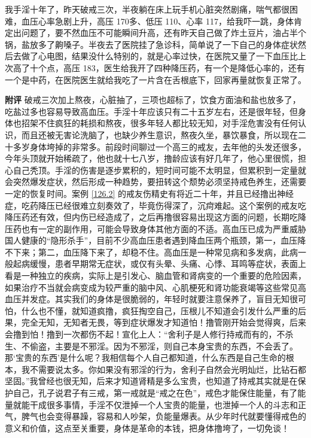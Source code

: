 \begin{case}
    我手淫十年了，昨天破戒三次，半夜躺在床上玩手机心脏突然剧痛，喘气都很困难，血压心率急剧上升，高压 170多、低压 110、心率 117，给我吓一跳，身体肯定出问题了，要不然血压不可能瞬间升高，还有昨天自己做了炸土豆片，油占半个锅，盐放多了齁嗓子。半夜去了医院挂了急诊科，简单说了一下自己的身体症状然后去做了心电图，结果没什么特别的，就是心率过快，在医院又量了一下血压比上次高了十个点，高压 183，医生给我开了四种降压药，有一个是降低心率的，还有一个是中药，在医院医生就给我吃了一片含在舌根底下，回家再量就恢复正常了。

    \textbf{附评} 破戒三次加上熬夜，心脏抽了，三项也超标了，饮食方面油和盐也放多了，吃盐过多也容易导致高血压。手淫十年应该只有二十五岁左右，还是很年轻，但身体也招架不住疯狂的耗损和熬夜，很多年轻人都比较无知，对手淫危害没有任何认识，而且还被无害论洗脑了，也缺少养生意识，熬夜久坐，暴饮暴食，所以现在二十多岁身体垮掉的非常多。前段时间聊过一个高三的戒友，去年他的头发还很多，今年头顶就开始稀疏了，他也就十七八岁，撸龄应该有好几年了，他心里很慌，担心自己秃顶。手淫的伤害是逐步累积的，短时间可能不太明显，但累积到一定量就会突然爆发症状，然后形成一种趋势，要扭转这个颓势必须坚持戒色养生，还需要一定的恢复时间。案例 \ref{126.2} 的戒友伤精史有将近二十年，并且已经撸出神经症，吃药降压已经很难立刻奏效了，毕竟伤得深了，沉疴难起。这个案例的戒友吃降压药还有效，但内伤已经造成了，之后再撸很容易出现这方面的问题，长期吃降压药也有一定的副作用，可能会导致身体其他方面的不适。高血压已成为严重威胁国人健康的“隐形杀手”，目前不少高血压患者遇到降血压两个瓶颈，第一，血压降不下来；第二，血压降下来了，却稳不住。高血压是一种常见病和多发病，此病一般起病缓慢，患者早期常无症状，或仅有头晕、头痛、心悸、耳鸣等症状，表面上看是一种独立的疾病，实际上是引发心、脑血管和肾病变的一个重要的危险因素，如果治疗不当就会病变成为较严重的脑中风、心肌梗死和肾功能衰竭等这些常见高血压并发症。其实我们的身体是很脆弱的，年轻时就要注意保养了，盲目无知很可怕，什么也不懂，就知道疯撸，疯狂掏空自己，压根儿不知道会引发什么严重的后果，完全无知，无知者无畏，等到症状爆发才知道怕！撸管刚开始会觉得爽，后来会撸到怕！撸到一次都伤不起！宣化上人：“舍利子是人修行持戒而有的，不杀生、不偷盗，主要是不邪淫。因为不邪淫，则自己本身宝贵的东西，不会丢了。那‘宝贵的东西’是什么呢？我相信每个人自己都知道，什么东西是自己生命的根本，我不需要说太多。你如果没有邪淫的行为，舍利子自然会光明灿烂，比钻石都坚固。”我曾经也很无知，后来才知道肾精是多么宝贵，也知道了持戒其实就是在保护自己，孔子说君子有三戒，第一戒就是“戒之在色”，戒色才能保住能量，有了能量就能干成很多事情，手淫不仅泄掉一个人宝贵的能量，也泄掉一个人的斗志和正气，脾气也会变得暴躁，容易和人吵架，负能量爆表。从少年时代就要懂得戒色的意义和价值，这点至关重要，身体是革命的本钱，把身体撸垮了，一切免谈！
\end{case}

